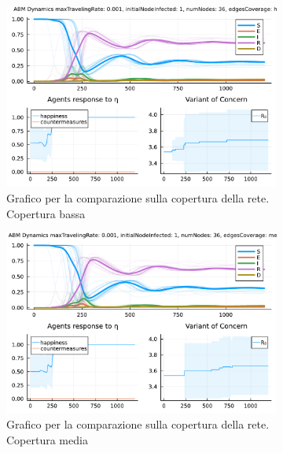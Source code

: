 \begin{figure}[!hb]
	\centering
	\begin{subfigure}[b]{0.3\textwidth}
		\centering
		\includegraphics[width=\textwidth]{img/SocialNetworkABM_65.pdf}
		\caption{Grafico per la comparazione sulla copertura della rete. Copertura bassa}
		\label{fig:comparison_highCoverage}
	\end{subfigure}
	\hfill
	\begin{subfigure}[b]{0.3\textwidth}
		\centering
		\includegraphics[width=\textwidth]{img/SocialNetworkABM_145.pdf}
		\caption{Grafico per la comparazione sulla copertura della rete. Copertura media}
		\label{fig:comparison_mediumCoverage}
	\end{subfigure}
	\hfill
	\begin{subfigure}[b]{0.3\textwidth}
		\centering

\end{subfigure}
\end{figure}
